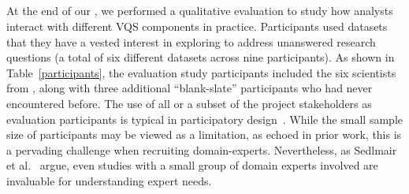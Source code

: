   \subsection{}
  At the end of our , we performed a qualitative evaluation to study how analysts interact with different VQS components in practice. Participants used datasets that they have a vested interest in exploring to address unanswered research questions (a total of six different datasets across nine participants). As shown in Table~\ref{participants}, the evaluation study participants included the six scientists from , along with three additional ``blank-slate'' participants who had never encountered \zvpp before. The use of all or a subset of the project stakeholders as evaluation participants is typical in participatory design~\cite{Bossen2016}. While the small sample size of participants may be viewed as a limitation, as echoed in prior work\cite{Batch2018,Mclachlan2008}, this is a pervading challenge when recruiting domain-experts. Nevertheless, as Sedlmair et al.~\cite{Sedlmair2012} argue, even studies with a small group of domain experts involved are invaluable for understanding expert needs. %
